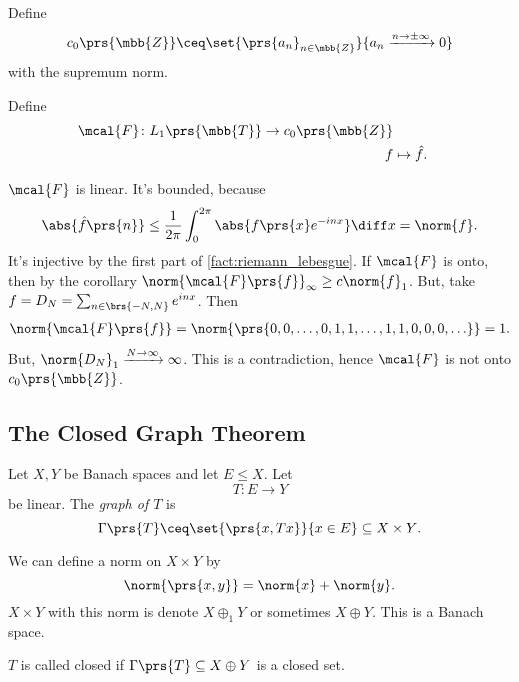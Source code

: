 \documentclass[10pt, twoside]{book}
\begin{document}
\begin{definition}
Define
\[c_0\prs{\mbb{Z}} \ceq \set{\prs{a_n}_{n \in \mbb{Z}}}{a_n \xrightarrow{n\to\pm\infty} 0}\]
with the supremum norm.
\end{definition}

\begin{definition}
Define
\begin{align*}
\mcal{F} \colon L_1\prs{\mbb{T}} \to c_0\prs{\mbb{Z}} \\
f &\mapsto \hat{f} \text{.}
\end{align*}
\end{definition}

\begin{remark}
$\mcal{F}$ is linear. It's bounded, because
\[\abs{\hat{f}\prs{n}} \leq \frac{1}{2\pi} \int_0^{2\pi} \abs{f\prs{x} e^{-inx}} \diff x = \norm{f} \text{.}\]
It's injective by the first part of \ref{fact:riemann_lebesgue}.
If $\mcal{F}$ is onto, then by the corollary $\norm{\mcal{F}\prs{f}}_\infty \geq c\norm{f}_1$.
But, take $f = D_N = \sum_{n \in \brs{-N,N}} e^{inx}$. Then
\begin{align*}
\norm{\mcal{F}\prs{f}} = \norm{\prs{0,0,\ldots, 0, 1, 1, \ldots, 1, 1, 0, 0, 0, \ldots}} = 1 \text{.}
\end{align*}
But, $\norm{D_N}_1 \xrightarrow{N\to\infty} \infty$.
This is a contradiction, hence $\mcal{F}$ is not onto $c_0\prs{\mbb{Z}}$.
\end{remark}

\subsection{The Closed Graph Theorem}

\begin{definition}
Let $X,Y$ be Banach spaces and let $E \leq X$. Let
\[T \colon E \to Y\]
be linear. The \emph{graph of $T$} is
\[\Gamma\prs{T} \ceq \set{\prs{x, Tx}}{x \in E} \subseteq X \times Y \text{.}\]
\end{definition}

\begin{remark}
We can define a norm on $X \times Y$ by
\[\norm{\prs{x,y}} = \norm{x} + \norm{y} \text{.}\]
$X \times Y$ with this norm is denote $X \oplus_1 Y$ or sometimes $X \oplus Y$. This is a Banach space.
\end{remark}

\begin{definition}
$T$ is called closed if $\Gamma\prs{T} \subseteq X \oplus Y$ is a closed set.
\end{definition}
\end{document}
